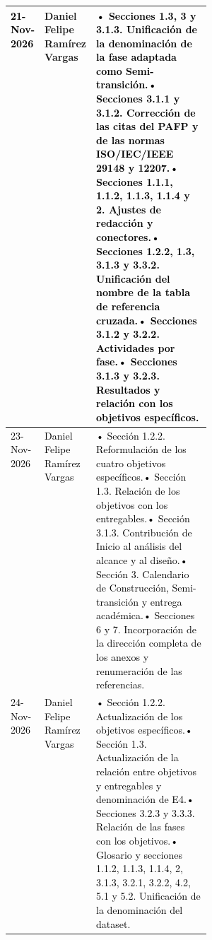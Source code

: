 \begin{longtable}{|p{0.11\linewidth}|p{0.22\linewidth}|p{}|}
  \textcolor{black}{21-Nov-2026} & Daniel Felipe Ramírez Vargas & \textcolor{black}{• Secciones 1.3, 3 y 3.1.3. Unificación de la denominación de la fase adaptada como Semi-transición.\newline • Secciones 3.1.1 y 3.1.2. Corrección de las citas del PAFP y de las normas ISO/IEC/IEEE 29148 y 12207.}\newline \textcolor{black}{• Secciones 1.1.1, 1.1.2, 1.1.3, 1.1.4 y 2. Ajustes de redacción y conectores.}\newline \textcolor{black}{• Secciones 1.2.2, 1.3, 3.1.3 y 3.3.2. Unificación del nombre de la tabla de referencia cruzada.}\newline \textcolor{black}{• Secciones 3.1.2 y 3.2.2. Actividades por fase.\newline • Secciones 3.1.3 y 3.2.3. Resultados y relación con los objetivos específicos.}\\\hline
\textcolor{black}{23-Nov-2026} & \textcolor{black}{Daniel Felipe Ramírez Vargas} & \textcolor{black}{• Sección 1.2.2. Reformulación de los cuatro objetivos específicos.\newline • Sección 1.3. Relación de los objetivos con los entregables.\newline • Sección 3.1.3. Contribución de Inicio al análisis del alcance y al diseño.}\newline \textcolor{black}{• Sección 3. Calendario de Construcción, Semi-transición y entrega académica.\newline • Secciones 6 y 7. Incorporación de la dirección completa de los anexos y renumeración de las referencias.}\\\hline\textcolor{black}{24-Nov-2026} & \textcolor{black}{Daniel Felipe Ramírez Vargas} & \textcolor{black}{• Sección 1.2.2. Actualización de los objetivos específicos.\newline • Sección 1.3. Actualización de la relación entre objetivos y entregables y denominación de E4.\newline • Secciones 3.2.3 y 3.3.3. Relación de las fases con los objetivos.\newline • Glosario y secciones 1.1.2, 1.1.3, 1.1.4, 2, 3.1.3, 3.2.1, 3.2.2, 4.2, 5.1 y 5.2. Unificación de la denominación del dataset.}\\\hline
\end{longtable}\endgroup
\clearpage
